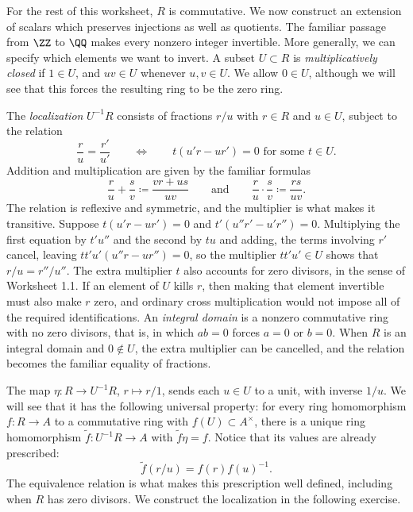 \documentclass[12pt,reqno]{amsart}
\begin{document}
\hrulefill

For the rest of this worksheet, $R$ is commutative. We now construct an extension of scalars which preserves injections as well as quotients. The familiar passage from $\ZZ$ to $\QQ$ makes every nonzero integer invertible. More generally, we can specify which elements we want to invert. A subset $U\subset R$ is \emph{multiplicatively closed} if $1\in U$, and $uv\in U$ whenever $u,v\in U$. We allow $0\in U$, although we will see that this forces the resulting ring to be the zero ring.

The \emph{localization} $U^{-1}R$ consists of fractions $r/u$ with $r\in R$ and $u\in U$, subject to the relation
\[
\frac ru=\frac{r'}{u'}\qquad\Longleftrightarrow\qquad t(u'r-ur')=0\text{ for some }t\in U.
\]
Addition and multiplication are given by the familiar formulas
\[
\frac ru+\frac sv\coloneqq\frac{vr+us}{uv}\qquad\text{and}\qquad\frac ru\cdot\frac sv\coloneqq\frac{rs}{uv}.
\]
The relation is reflexive and symmetric, and the multiplier is what makes it transitive. Suppose $t(u'r-ur')=0$ and $t'(u''r'-u'r'')=0$. Multiplying the first equation by $t'u''$ and the second by $tu$ and adding, the terms involving $r'$ cancel, leaving $tt'u'(u''r-ur'')=0$, so the multiplier $tt'u'\in U$ shows that $r/u=r''/u''$. The extra multiplier $t$ also accounts for zero divisors, in the sense of Worksheet 1.1. If an element of $U$ kills $r$, then making that element invertible must also make $r$ zero, and ordinary cross multiplication would not impose all of the required identifications. An \emph{integral domain} is a nonzero commutative ring with no zero divisors, that is, in which $ab=0$ forces $a=0$ or $b=0$. When $R$ is an integral domain and $0\notin U$, the extra multiplier can be cancelled, and the relation becomes the familiar equality of fractions.

The map $\eta:R\to U^{-1}R$, $r\mapsto r/1$, sends each $u\in U$ to a unit, with inverse $1/u$. We will see that it has the following universal property: for every ring homomorphism $f:R\to A$ to a commutative ring with $f(U)\subset A^\times$, there is a unique ring homomorphism $\widetilde f:U^{-1}R\to A$ with $\widetilde f\eta=f$. Notice that its values are already prescribed:
\[
\widetilde f(r/u)=f(r)f(u)^{-1}.
\]
The equivalence relation is what makes this prescription well defined, including when $R$ has zero divisors. We construct the localization in the following exercise.

\hrulefill
\end{document}
